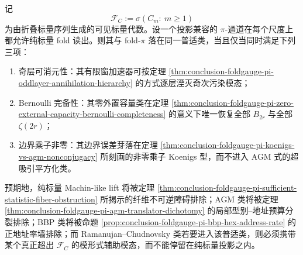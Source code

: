 \begin{conjecture}\label{conj:conclusion-foldgauge-modular-acceleration-measurability}
记
\[
\mathscr F_C:=\sigma(C_m:\ m\ge 1)
\]
为由折叠标量序列生成的可见标量代数。设一个投影兼容的 \(\pi\)-通道在每个尺度上都允许纯标量 fold 读出。则其与 fold-\(\pi\) 落在同一普适类，当且仅当同时满足下列三项：
\begin{enumerate}
  \item 奇层可消元性：其有限窗加速器可按定理 \ref{thm:conclusion-foldgauge-pi-oddlayer-annihilation-hierarchy} 的方式逐层湮灭奇次污染模态；
  \item Bernoulli 完备性：其零外置容量类在定理 \ref{thm:conclusion-foldgauge-pi-zero-external-capacity-bernoulli-completeness} 的意义下唯一恢复全部 \(B_{2r}\) 与全部 \(\zeta(2r)\)；
  \item 边界乘子非零：其边界误差芽落在定理 \ref{thm:conclusion-foldgauge-pi-koenigs-vs-agm-nonconjugacy} 所刻画的非零乘子 Koenigs 型，而不进入 AGM 式的超吸引平方化类。
\end{enumerate}
预期地，纯标量 Machin-like lift 将被定理 \ref{thm:conclusion-foldgauge-pi-sufficient-statistic-fiber-obstruction} 所揭示的纤维不可逆障碍排除；AGM 类将被定理 \ref{thm:conclusion-foldgauge-pi-agm-translator-dichotomy} 的局部型别--地址预算分裂排除；BBP 类将被命题 \ref{prop:conclusion-foldgauge-pi-bbp-hex-address-rate} 的正地址率墙排除；而 Ramanujan--Chudnovsky 类若要进入该普适类，则必须携带某个真正超出 \(\mathscr F_C\) 的模形式辅助模态，而不能停留在纯标量投影之内。
\end{conjecture}


